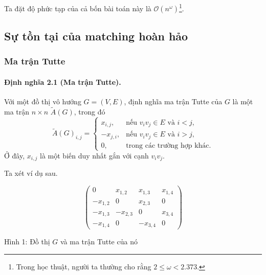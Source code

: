 \documentclass[11pt]{article}
\newcommand{\Oh}{\mathcal{O}}
\begin{document}
Ta đặt độ phức tạp của cả bốn bài toán này là
\(\Oh(n^\omega)\)\footnote{Trong học thuật, người ta thường cho rằng
\(2\le\omega<2.373\).}.

\subsection{Sự tồn tại của matching hoàn hảo}

\subsubsection{Ma trận Tutte}

\paragraph{Định nghĩa 2.1 (Ma trận Tutte).}
Với một đồ thị vô hướng \(G=(V,E)\), định nghĩa ma trận Tutte của \(G\) là một
ma trận \(n\times n\) \(\tilde A(G)\), trong đó
\[
  \tilde A(G)_{i,j}=
  \begin{cases}
    x_{i,j}, & \text{nếu } v_i v_j\in E \text{ và } i<j,\\
    -x_{j,i}, & \text{nếu } v_i v_j\in E \text{ và } i>j,\\
    0, & \text{trong các trường hợp khác.}
  \end{cases}
\]
Ở đây, \(x_{i,j}\) là một biến duy nhất gắn với cạnh \(v_i v_j\).

Ta xét ví dụ sau.

\begin{center}
\begin{minipage}{0.42\linewidth}
\centering
{}
\end{minipage}
\begin{minipage}{0.52\linewidth}
\[
\begin{pmatrix}
0 & x_{1,2} & x_{1,3} & x_{1,4}\\
-x_{1,2} & 0 & x_{2,3} & 0\\
-x_{1,3} & -x_{2,3} & 0 & x_{3,4}\\
-x_{1,4} & 0 & -x_{3,4} & 0
\end{pmatrix}
\]
\end{minipage}

\smallskip
Hình 1: Đồ thị \(G\) và ma trận Tutte của nó
\end{center}
\end{document}
